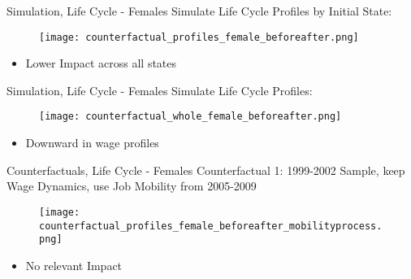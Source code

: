 \documentclass{beamer}
\begin{document}
\begin{frame}{Simulation, Life Cycle - Females}\label{EstimationLCFemalesIII}
	Simulate Life Cycle Profiles by Initial State:
	\begin{figure}[!t]
		\centering
		\begin{minipage}[b]{1\textwidth}{}
			\centering
			\texttt{[image: counterfactual\_profiles\_female\_beforeafter.png]}
		\end{minipage}
	\end{figure}
	\begin{itemize}
		\setlength{\itemsep}{0.7 cm}
		\item Lower Impact across all states
	\end{itemize}
\end{frame}

\begin{frame}{Simulation, Life Cycle - Females}\label{EstimationLCFemalesWhole}
	Simulate Life Cycle Profiles:
	\begin{figure}[!t]
		\centering
		\begin{minipage}[b]{1\textwidth}{}
			\centering
			\texttt{[image: counterfactual\_whole\_female\_beforeafter.png]}
		\end{minipage}
	\end{figure}
	\begin{itemize}
		\setlength{\itemsep}{0.7 cm}
		\item Downward in wage profiles
	\end{itemize}
\end{frame}

\begin{frame}{Counterfactuals, Life Cycle - Females}\label{EstimationLCFemalesMobility}
Counterfactual 1: 1999-2002 Sample, keep Wage Dynamics, use Job Mobility from 2005-2009
\begin{figure}[!t]
\centering
\begin{minipage}[b]{1\textwidth}{}
\centering
\texttt{[image: counterfactual\_profiles\_female\_beforeafter\_mobilityprocess.png]}
\end{minipage}
\end{figure}
\begin{itemize}
\setlength{\itemsep}{0.7 cm}
\item No relevant Impact
\end{itemize}
\end{frame}
\end{document}
